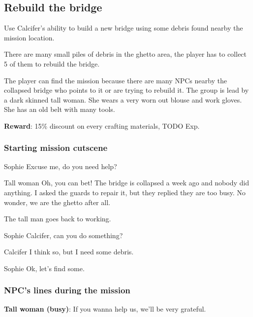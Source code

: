 \subsection{Rebuild the bridge}
Use Calcifer's ability to build a new bridge using some debris found nearby the mission location.

There are many small piles of debris in the ghetto area, the player has to collect 5 of them to rebuild the bridge.

The player can find the mission because there are many NPCs nearby the collapsed bridge who points to it or are trying to rebuild it. The group is lead by a dark skinned tall woman. She wears a very worn out blouse and work gloves. She has an old belt with many tools.

\textbf{Reward}: 15\% discount on every crafting materials, TODO Exp.

\subsubsection*{Starting mission cutscene}
\begin{screenplay}

\begin{dialogue}{Sophie}
Excuse me, do you need help?
\end{dialogue}

\begin{dialogue}{Tall woman}
Oh, you can bet! The bridge is collapsed a week ago and nobody did anything. I asked the guards to repair it, but they replied they are too busy. No wonder, we are the ghetto after all.
\end{dialogue}

The tall man goes back to working.

\begin{dialogue}{Sophie}
Calcifer, can you do something?
\end{dialogue}

\begin{dialogue}{Calcifer}
I think so, but I need some debris.
\end{dialogue}

\begin{dialogue}{Sophie}
Ok, let's find some.
\end{dialogue}

\end{screenplay}

\subsubsection*{NPC's lines during the mission}
\textbf{Tall woman (busy)}: If you wanna help us, we'll be very grateful.

